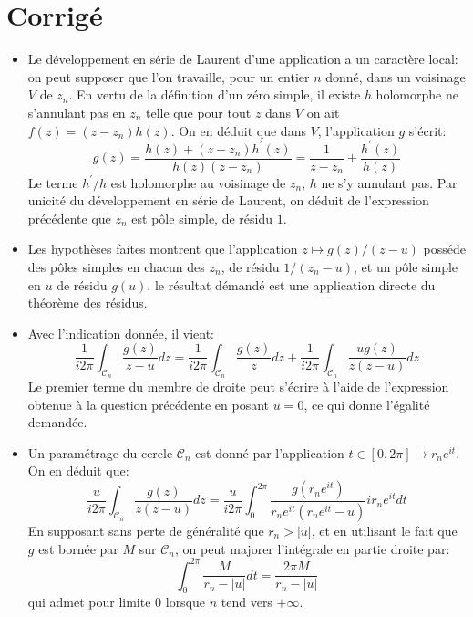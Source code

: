 \documentclass[a4paper,12pt]{amsart}
\begin{document}
\section*{Corrigé}
\begin{itemize}
\item Le développement en série de Laurent d'une application a un caractère local: on peut supposer que l'on travaille, pour un entier $n$ donné, dans un voisinage $V$ de $z_n$. En vertu de la définition d'un zéro simple, il existe $h$ holomorphe ne s'annulant pas en $z_n$ telle que pour tout $z$ dans $V$ on ait $f(z) = (z-z_n)h(z)$. On en déduit que dans $V$, l'application $g$ s'écrit:
\begin{equation}
g(z) = \frac{h(z) + (z-z_n)h^\prime(z)}{h(z)(z-z_n)} = \frac{1}{z-z_n} + \frac{h^\prime(z)}{h(z)}
\end{equation}
Le terme $h^\prime/h$ est holomorphe au voisinage de $z_n$, $h$ ne s'y annulant pas. Par unicité du développement en série de Laurent, on déduit de l'expression précédente que $z_n$ est pôle simple, de résidu $1$.
\item Les hypothèses faites montrent que l'application $z \mapsto g(z)/(z-u)$ posséde des pôles simples en chacun des $z_n$, de résidu $1/(z_n-u)$, et un pôle simple en $u$ de résidu $g(u)$. le résultat démandé est une application directe du théorème des résidus. 
\item Avec l'indication donnée, il vient:
\begin{equation}
\frac{1}{i 2 \pi} \int_{\mathcal{C}_n}\frac{g(z)}{z-u} dz = \frac{1}{i 2 \pi} \int_{\mathcal{C}_n}\frac{g(z)}{z} dz + 
 \frac{1}{i 2 \pi} \int_{\mathcal{C}_n}\frac{u g(z)}{z(z-u)} dz
\end{equation}
Le premier terme du membre de droite peut s'écrire à l'aide de l'expression obtenue à la question précédente en posant $u = 0$, ce qui donne l'égalité demandée.
\item Un paramétrage du cercle $\mathcal{C}_n$ est donné par l'application $t \in [0,2\pi] \mapsto r_n e^{it}$. On en déduit que:
\begin{equation}
\frac{u}{i 2 \pi} \int_{\mathcal{C}_n}\frac{g(z)}{z(z-u)} dz = \frac{u}{i 2 \pi} \int_0^{2\pi} \frac{g\left(r_n e^{it}
\right)}{r_n e^{it}(r_n e^{it}-u)} i r_n e^{it} dt
\end{equation}
En supposant sans perte de généralité que $r_n > |u|$, et en utilisant le fait que $g$ est bornée par $M$ sur $\mathcal{C}_n$, on peut majorer l'intégrale en partie droite par:
\begin{equation}
\int_0^{2\pi} \frac{M}{r_n - |u|} dt = \frac{2 \pi M}{r_n -|u|}
\end{equation}
qui admet pour limite $0$ lorsque $n$ tend vers $+\infty$.
\end{itemize}
\end{document}
